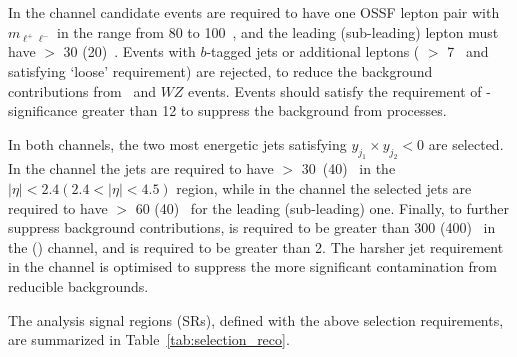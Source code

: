 In the \llvvjj channel candidate events  are required to have one OSSF lepton pair with $m_{\ell^+\ell^-}$ in the range from 80 to 100~\GeV{},
and the leading (sub-leading) lepton must have \pt{} $>$ 30 (20)~\GeV{}.
Events with $b$-tagged jets or additional leptons (\pt{} $>$ 7~\GeV{} and satisfying `loose' requirement) are rejected, to reduce the background contributions from \ttbar~and $WZ$ events.
Events should satisfy the requirement of \met-significance greater than 12 to suppress the background from \Zjet processes.

In both channels, the two most energetic jets satisfying $y_{j_1} \times y_{j_2} < 0$ are selected.
In the \lllljj channel the jets are required to have \pT $>$ 30~(40)~\GeV{} in the $|\eta| < 2.4 (2.4 < |\eta| < 4.5)$ region,
while in the \llvvjj channel the selected jets are required to have \pT $>$ 60 (40)~\GeV{} for the leading (sub-leading) one.
Finally, to further suppress background contributions, \mjj is required to be greater than 300 (400)~\GeV{} in the \lllljj (\llvvjj) channel, and \dyjj is required to be greater than 2.
The harsher jet requirement in the \llvvjj channel is optimised to suppress the more significant contamination from reducible backgrounds. 

The analysis signal regions (SRs), defined with the above selection requirements, are summarized in Table~\ref{tab:selection_reco}.

